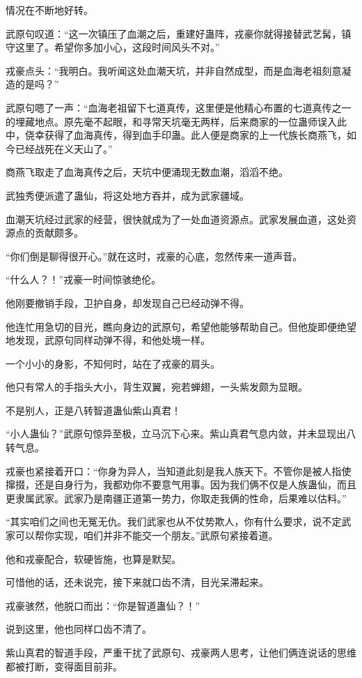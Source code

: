 \begin{this_body}
情况在不断地好转。

武原句叹道：“这一次镇压了血潮之后，重建好蛊阵，戎豪你就得接替武艺髯，镇守这里了。希望你多加小心，这段时间风头不对。”

戎豪点头：“我明白。我听闻这处血潮天坑，并非自然成型，而是血海老祖刻意凝造的是吗？”

武原句嗯了一声：“血海老祖留下七道真传，这里便是他精心布置的七道真传之一的埋藏地点。原先毫不起眼，和寻常天坑毫无两样，后来商家的一位蛊师误入此中，侥幸获得了血海真传，得到血手印蛊。此人便是商家的上一代族长商燕飞，如今已经战死在义天山了。”

商燕飞取走了血海真传之后，天坑中便涌现无数血潮，滔滔不绝。

武独秀便派遣了蛊仙，将这处地方吞并，成为武家疆域。

血潮天坑经过武家的经营，很快就成为了一处血道资源点。武家发展血道，这处资源点的贡献颇多。

“你们倒是聊得很开心。”就在这时，戎豪的心底，忽然传来一道声音。

“什么人？！”戎豪一时间惊骇绝伦。

他刚要撤销手段，卫护自身，却发现自己已经动弹不得。

他连忙用急切的目光，瞧向身边的武原句，希望他能够帮助自己。但他旋即便绝望地发现，武原句同样动弹不得，和他处境一样。

一个小小的身影，不知何时，站在了戎豪的肩头。

他只有常人的手指头大小，背生双翼，宛若蝉翅，一头紫发颇为显眼。

不是别人，正是八转智道蛊仙紫山真君！

“小人蛊仙？”武原句惊异至极，立马沉下心来。紫山真君气息内敛，并未显现出八转气息。

戎豪也紧接着开口：“你身为异人，当知道此刻是我人族天下。不管你是被人指使撺掇，还是自身行为，我都劝你不要意气用事。因为我们俩不仅是人族蛊仙，而且更隶属武家。武家乃是南疆正道第一势力，你取走我俩的性命，后果难以估料。”

“其实咱们之间也无冤无仇。我们武家也从不仗势欺人，你有什么要求，说不定武家可以帮你实现，咱们并非不能交一个朋友。”武原句紧接着道。

他和戎豪配合，软硬皆施，也算是默契。

可惜他的话，还未说完，接下来就口齿不清，目光呆滞起来。

戎豪骇然，他脱口而出：“你是智道蛊仙？！”

说到这里，他也同样口齿不清了。

紫山真君的智道手段，严重干扰了武原句、戎豪两人思考，让他们俩连说话的思维都被打断，变得面目前非。


\end{this_body}
